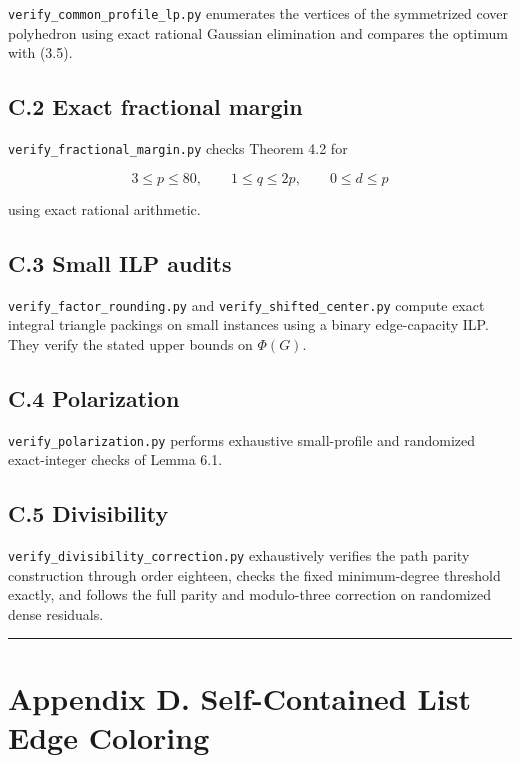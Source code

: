 \documentclass[
  11pt,
]{article}
\begin{document}
\texttt{verify\_common\_profile\_lp.py} enumerates the vertices of the
symmetrized cover polyhedron using exact rational Gaussian elimination
and compares the optimum with (3.5).

\subsection{C.2 Exact fractional
margin}\label{c.2-exact-fractional-margin}

\texttt{verify\_fractional\_margin.py} checks Theorem 4.2 for

\[
3\le p\le80,
\qquad
1\le q\le2p,
\qquad
0\le d\le p
\]

using exact rational arithmetic.

\subsection{C.3 Small ILP audits}\label{c.3-small-ilp-audits}

\texttt{verify\_factor\_rounding.py} and
\texttt{verify\_shifted\_center.py} compute exact integral triangle
packings on small instances using a binary edge-capacity ILP. They
verify the stated upper bounds on \(\Phi(G)\).

\subsection{C.4 Polarization}\label{c.4-polarization}

\texttt{verify\_polarization.py} performs exhaustive small-profile and
randomized exact-integer checks of Lemma 6.1.

\subsection{C.5 Divisibility}\label{c.5-divisibility}

\texttt{verify\_divisibility\_correction.py} exhaustively verifies the
path parity construction through order eighteen, checks the fixed
minimum-degree threshold exactly, and follows the full parity and
modulo-three correction on randomized dense residuals.

\begin{center}\rule{0.5\linewidth}{0.5pt}\end{center}

\section{Appendix D. Self-Contained List Edge
Coloring}\label{appendix-d.-self-contained-list-edge-coloring}
\end{document}
